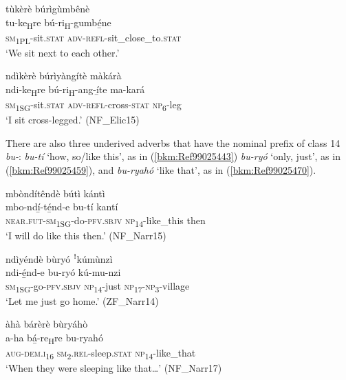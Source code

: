 \ea
\label{bkm:Ref451866568}
tùkèrè búrìgùmbênè\\
\gll tu-ke\textsubscript{H}re    bú-ri\textsubscript{H}-gumbé̲ne\\
\textsc{sm}\textsubscript{1PL}-sit.\textsc{stat}  \textsc{adv}-\textsc{refl}-sit\_close\_to.\textsc{stat}\\
\glt ‘We sit next to each other.’
\z

\ea
\label{bkm:Ref451866585}
ndìkèrè búrìyàngítè màkárà\\
\gll ndi-ke\textsubscript{H}re    bú-ri\textsubscript{H}-ang-í̲te    ma-kará\\
\textsc{sm}\textsubscript{1SG}-sit.\textsc{stat}  \textsc{adv}-\textsc{refl}-cross-\textsc{stat}  \textsc{np}\textsubscript{6}-leg\\
\glt ‘I sit cross-legged.’ (NF\_Elic15)
\z

There are also three underived adverbs that have the nominal prefix of class 14 \textit{bu-}: \textit{bu-tí} ‘how, so/like this’, as in (\ref{bkm:Ref99025443}) \textit{bu-ryó} ‘only, just’, as in (\ref{bkm:Ref99025459}), and \textit{bu-ryahó} ‘like that’, as in (\ref{bkm:Ref99025470}).

\ea
\label{bkm:Ref99025443}
mbòndítêndè bútì kántì\\
\gll mbo-ndí̲-té̲nd-e      bu-tí      kantí\\
\textsc{near}.\textsc{fut}-\textsc{sm}\textsubscript{1SG}-do-\textsc{pfv}.\textsc{sbjv}  \textsc{np}\textsubscript{14}-like\_this  then\\
\glt ‘I will do like this then.’ (NF\_Narr15)
\z

\ea
\label{bkm:Ref99025459}
ndìyéndè bùryó ꜝkúmùnzì\\
\gll ndi-é̲nd-e    bu-ryó  kú-mu-nzi\\
\textsc{sm}\textsubscript{1SG}-go-\textsc{pfv}.\textsc{sbjv}  \textsc{np}\textsubscript{14}-just  \textsc{np}\textsubscript{17}-\textsc{np}\textsubscript{3}-village\\
\glt ‘Let me just go home.’ (ZF\_Narr14)
\z

\ea
\label{bkm:Ref99025470}
àhà bárèrè bùryáhò\\
\gll a-ha    bá̲-re\textsubscript{H}re    bu-ryahó\\
\textsc{aug}-\textsc{dem}.\textsc{i}\textsubscript{16}  \textsc{sm}\textsubscript{2}.\textsc{rel}-sleep.\textsc{stat}  \textsc{np}\textsubscript{14}-like\_that\\
\glt ‘When they were sleeping like that…’ (NF\_Narr17)
\z


